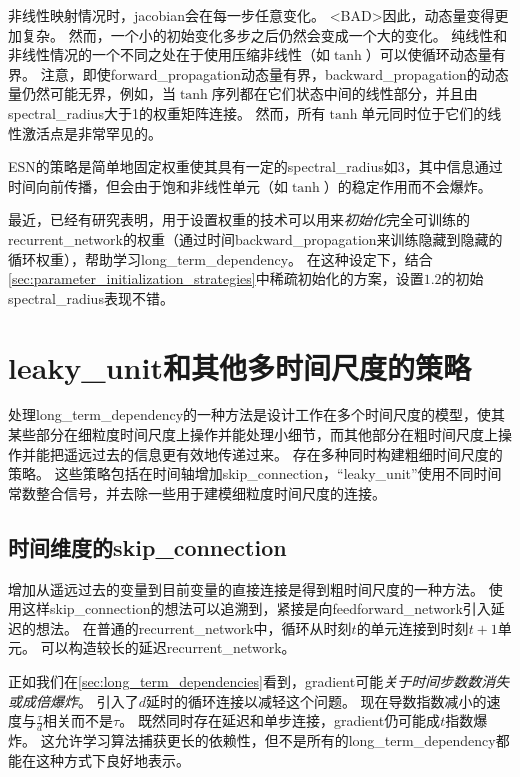 非线性映射情况时，\gls{jacobian}会在每一步任意变化。
<BAD>因此，动态量变得更加复杂。
然而，一个小的初始变化多步之后仍然会变成一个大的变化。
纯线性和非线性情况的一个不同之处在于使用压缩非线性（如$\tanh$）可以使循环动态量有界。
注意，即使\gls{forward_propagation}动态量有界，\gls{backward_propagation}的动态量仍然可能无界，例如，当$\tanh$序列都在它们状态中间的线性部分，并且由\gls{spectral_radius}大于1的权重矩阵连接。
然而，所有$\tanh$单元同时位于它们的线性激活点是非常罕见的。


\gls{ESN}的策略是简单地固定权重使其具有一定的\gls{spectral_radius}如3，其中信息通过时间向前传播，但会由于饱和非线性单元（如$\tanh$）的稳定作用而不会爆炸。

最近，已经有研究表明，用于设置权重的技术可以用来\emph{初始化}完全可训练的\gls{recurrent_network}的权重（通过时间\gls{backward_propagation}来训练隐藏到隐藏的循环权重），帮助学习\gls{long_term_dependency}\citep{Sutskever-thesis2012,sutskeverimportance}。
在这种设定下，结合\ref{sec:parameter_initialization_strategies}中稀疏初始化的方案，设置$1.2$的初始\gls{spectral_radius}表现不错。


\section{\gls{leaky_unit}和其他多时间尺度的策略}
\label{sec:leaky_units_and_other_strategiesfor_multiple_time_scales}
处理\gls{long_term_dependency}的一种方法是设计工作在多个时间尺度的模型，使其某些部分在细粒度时间尺度上操作并能处理小细节，而其他部分在粗时间尺度上操作并能把遥远过去的信息更有效地传递过来。
存在多种同时构建粗细时间尺度的策略。
这些策略包括在时间轴增加\gls{skip_connection}，``\gls{leaky_unit}''使用不同时间常数整合信号，并去除一些用于建模细粒度时间尺度的连接。


\subsection{时间维度的\gls{skip_connection}}
\label{sec:adding_skip_connections_through_time}
增加从遥远过去的变量到目前变量的直接连接是得到粗时间尺度的一种方法。
使用这样\gls{skip_connection}的想法可以追溯到\cite{Lin-ieeetnn96}，紧接是向\gls{feedforward_network}引入延迟的想法\citep{Lang+Hinton88}。
在普通的\gls{recurrent_network}中，循环从时刻$t$的单元连接到时刻$t+1$单元。
可以构造较长的延迟\gls{recurrent_network}\citep{Bengio91z}。

正如我们在\ref{sec:long_term_dependencies}看到，\gls{gradient}可能\emph{关于时间步数数消失或成倍爆炸}。
\citep{Lin-ieeetnn96}引入了$d$延时的循环连接以减轻这个问题。
现在导数指数减小的速度与$\frac{\tau}{d}$相关而不是$\tau$。
既然同时存在延迟和单步连接，\gls{gradient}仍可能成$t$指数爆炸。
这允许学习算法捕获更长的依赖性，但不是所有的\gls{long_term_dependency}都能在这种方式下良好地表示。

